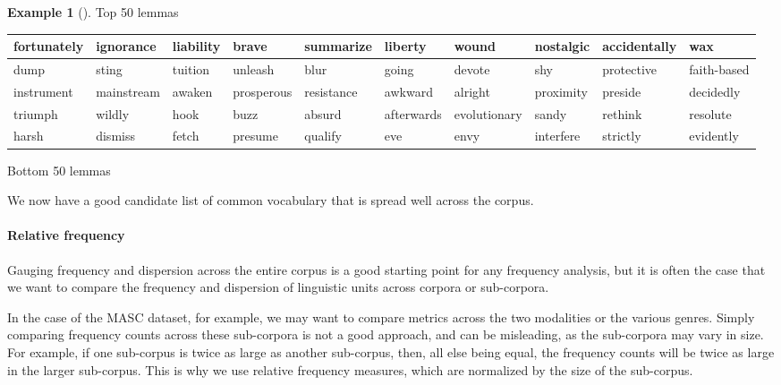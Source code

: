 \documentclass[
  letterpaper,
  DIV=11,
  numbers=noendperiod]{scrreport}
\let\oldparagraph\paragraph
\renewcommand{\paragraph}[1]{\oldparagraph{#1}\mbox{}}
\theoremstyle{definition}
\newtheorem{example}{Example}[chapter]
\theoremstyle{remark}
\begin{document}
\begin{example}[]
\begin{table}
\begin{minipage}[t]{\linewidth}
{Top 50 lemmas 

}

\end{minipage}%
\newline
\begin{minipage}[t]{\linewidth}

{\centering 

\hypertarget{tbl-eda-masc-dp-filter-2}{}
\tabularnewline

\centering
\begin{tabular}{l|l|l|l|l|l|l|l|l|l}
\hline
fortunately & ignorance & liability & brave & summarize & liberty & wound & nostalgic & accidentally & wax\\
\hline
dump & sting & tuition & unleash & blur & going & devote & shy & protective & faith-based\\
\hline
instrument & mainstream & awaken & prosperous & resistance & awkward & alright & proximity & preside & decidedly\\
\hline
triumph & wildly & hook & buzz & absurd & afterwards & evolutionary & sandy & rethink & resolute\\
\hline
harsh & dismiss & fetch & presume & qualify & eve & envy & interfere & strictly & evidently\\
\hline
\end{tabular}

Bottom 50 lemmas 

}

\end{minipage}%

\end{table}

\end{example}

We now have a good candidate list of common vocabulary that is spread
well across the corpus.

\hypertarget{sec-eda-frequency-relative}{%
\paragraph{Relative frequency}\label{sec-eda-frequency-relative}}

Gauging frequency and dispersion across the entire corpus is a good
starting point for any frequency analysis, but it is often the case that
we want to compare the frequency and dispersion of linguistic units
across corpora or sub-corpora.

In the case of the MASC dataset, for example, we may want to compare
metrics across the two modalities or the various genres. Simply
comparing frequency counts across these sub-corpora is not a good
approach, and can be misleading, as the sub-corpora may vary in size.
For example, if one sub-corpus is twice as large as another sub-corpus,
then, all else being equal, the frequency counts will be twice as large
in the larger sub-corpus. This is why we use relative frequency
measures, which are normalized by the size of the sub-corpus.
\end{document}
